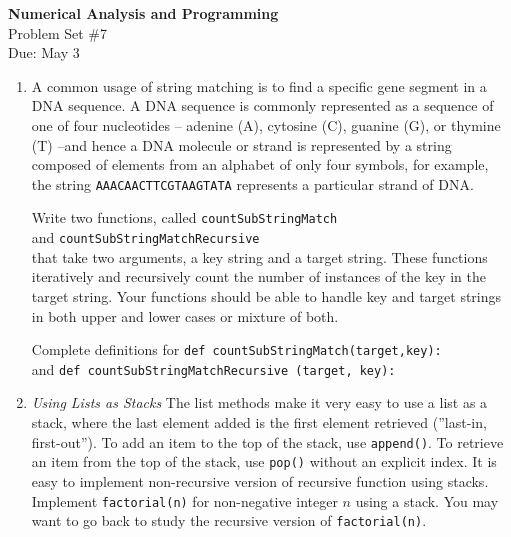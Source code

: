 \documentclass[12pt]{article}
\begin{document}
\begin{center}
\Large
\textbf{Numerical Analysis and Programming}\\
\large
Problem Set \#7\\
Due: May 3
\end{center}

\begin{enumerate}

\item A common usage of string matching is to find a specific gene segment in a DNA sequence. A DNA sequence is commonly represented as a sequence of one of four nucleotides – adenine (A), cytosine (C), guanine (G), or thymine (T) –and hence a DNA molecule or strand is represented by a string composed of elements from an alphabet of only four symbols, for example, the string 
\texttt{AAACAACTTCGTAAGTATA} represents a particular strand of DNA. 

Write two functions, called {\small \tt countSubStringMatch} \\ and 
{\small\tt countSubStringMatchRecursive} 
\\that 
take two arguments, a key string and a target string.  These functions iteratively and recursively count 
the number of instances of the key in the target string. Your functions should be able to handle key and target strings in both upper and lower cases or mixture of both.

Complete definitions for 
{\small \tt def countSubStringMatch(target,key): }\\
and 
{\small \tt def countSubStringMatchRecursive (target, key):}\\

\item  \textit{Using Lists as Stacks}
The list methods make it very easy to use a list as a stack, where the last element added is the first element retrieved (''last-in, first-out''). To add an item to the top of the stack, use \texttt{append()}. To retrieve an item from the top of the stack, use \texttt{pop()} without an explicit index. It is easy to implement non-recursive version of recursive function using stacks. Implement \texttt{factorial(n)} for non-negative integer $n$ using a stack. You may want to go back to study the recursive version of \texttt{factorial(n)}.

\end{enumerate} 
\end{document}
